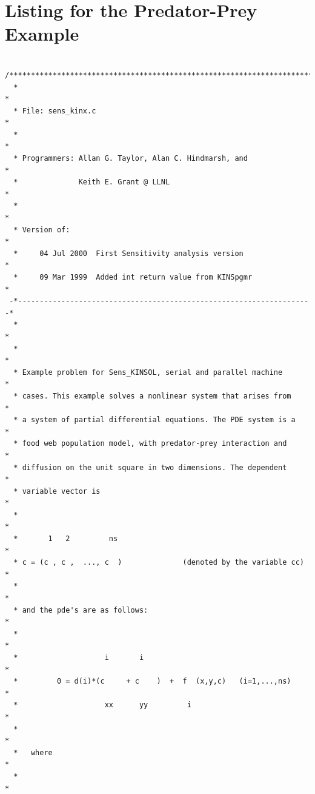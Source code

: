 \documentclass[11pt]{article}
\begin{document}
\appendix

\section{Listing for the Predator-Prey Example}
\label{section:predprey}
\footnotesize
\begin{verbatim}
 /**********************************************************************
  *                                                                    *
  * File: sens_kinx.c                                                  *
  *                                                                    *
  * Programmers: Allan G. Taylor, Alan C. Hindmarsh, and               *
  *              Keith E. Grant @ LLNL                                 *
  *                                                                    *
  * Version of:                                                        *
  *     04 Jul 2000  First Sensitivity analysis version                *
  *     09 Mar 1999  Added int return value from KINSpgmr              *
 -*--------------------------------------------------------------------*
  *                                                                    *
  *                                                                    *
  * Example problem for Sens_KINSOL, serial and parallel machine       *
  * cases. This example solves a nonlinear system that arises from     *
  * a system of partial differential equations. The PDE system is a    *
  * food web population model, with predator-prey interaction and      *
  * diffusion on the unit square in two dimensions. The dependent      *
  * variable vector is                                                 *
  *                                                                    *
  *       1   2         ns                                             *
  * c = (c , c ,  ..., c  )              (denoted by the variable cc)  *
  *                                                                    *
  * and the pde's are as follows:                                      *
  *                                                                    *
  *                    i       i                                       *
  *         0 = d(i)*(c     + c    )  +  f  (x,y,c)   (i=1,...,ns)     *
  *                    xx      yy         i                            *
  *                                                                    *
  *   where                                                            *
  *                                                                    *

\end{verbatim}
\end{document}
